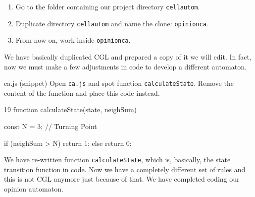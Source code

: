 \begin{enumerate}
\item Go to the folder containing our project directory \texttt{cellautom}.
\item Duplicate directory \texttt{cellautom} and name the clone: \texttt{opinionca}.
\item From now on, work inside \texttt{opinionca}.
\end{enumerate}

We have basically duplicated CGL and prepared a copy of it we will edit. In fact, now we must
make a few adjustments in code to develop a different automaton.

\begin{programcode}{ca.js (snippet)}
Open \texttt{ca.js} and spot function \texttt{calculateState}. Remove the content of the
function and place this code instead.
\begin{codeh1}{1}{9}
function calculateState(state, neighSum) {
  const N = 3; // Turning Point

  if (neighSum > N) {
    return 1;
  } else {
    return 0;
  }
}
\end{codeh1}
\end{programcode}

We have re-written function \texttt{calculateState}, which is, basically, the state
transition function in code. Now we have a completely different set of rules and this is
not CGL anymore just because of that. We have completed coding our opinion automaton.

